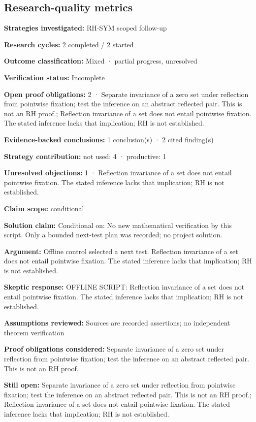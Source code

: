 \documentclass[11pt]{article}
\begin{document}
\subsection{Research-quality metrics}
\textbf{Strategies investigated:} RH-SYM scoped follow-up\par
\textbf{Research cycles:} 2 completed / 2 started\par
\textbf{Outcome classification:} Mixed · partial progress, unresolved\par
\textbf{Verification status:} Incomplete\par
\textbf{Open proof obligations:} 2 · Separate invariance of a zero set under reflection from pointwise fixation; test the inference on an abstract reflected pair. This is not an RH proof.; Reflection invariance of a set does not entail pointwise fixation. The stated inference lacks that implication; RH is not established.\par
\textbf{Evidence-backed conclusions:} 1 conclusion(s) · 2 cited finding(s)\par
\textbf{Strategy contribution:} not used: 4 · productive: 1\par
\textbf{Unresolved objections:} 1 · Reflection invariance of a set does not entail pointwise fixation. The stated inference lacks that implication; RH is not established.\par
\textbf{Claim scope:} conditional\par
\textbf{Solution claim:} Conditional on: No new mathematical verification by this script. Only a bounded next-test plan was recorded; no project solution.\par
\textbf{Argument:} Offline control selected a next test. Reflection invariance of a set does not entail pointwise fixation. The stated inference lacks that implication; RH is not established.\par
\textbf{Skeptic response:} OFFLINE SCRIPT: Reflection invariance of a set does not entail pointwise fixation. The stated inference lacks that implication; RH is not established.\par
\textbf{Assumptions reviewed:} Sources are recorded assertions; no independent theorem verification\par
\textbf{Proof obligations considered:} Separate invariance of a zero set under reflection from pointwise fixation; test the inference on an abstract reflected pair. This is not an RH proof.\par
\textbf{Still open:} Separate invariance of a zero set under reflection from pointwise fixation; test the inference on an abstract reflected pair. This is not an RH proof.; Reflection invariance of a set does not entail pointwise fixation. The stated inference lacks that implication; RH is not established.\par
\end{document}
